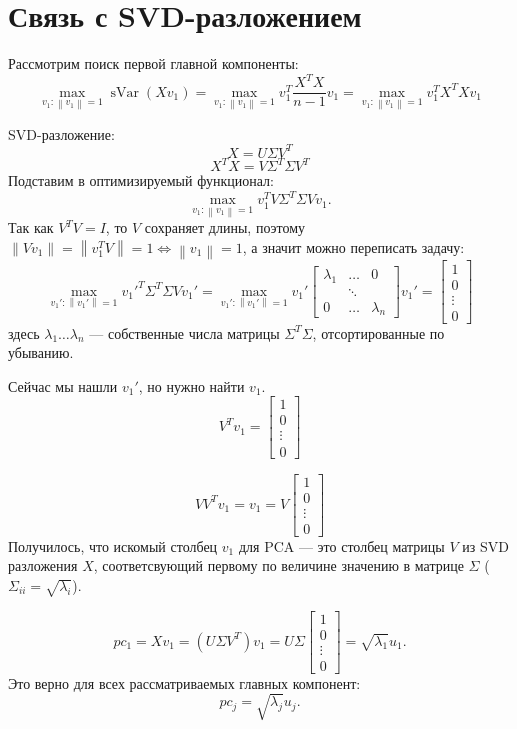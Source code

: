 \documentclass[12pt]{article} %
\theoremstyle{definition} %
\DeclareMathOperator{\sVar}{sVar}
\begin{document}
\section{Связь с SVD-разложением}
Рассмотрим поиск первой главной компоненты:
\[ \max_{v_1: \left\| v_1 \right\| = 1} \sVar(Xv_1)
= \max_{v_1: \left\| v_1 \right\| = 1} v_1^T \frac{X^TX}{n-1} v_1 =
\max_{v_1: \left\| v_1 \right\| = 1} v_1^T X^TX v_1 \]

SVD-разложение:
\[ X = U\Sigma V^T \]
\[ X^TX = V \Sigma^T \Sigma V^T \]
Подставим в оптимизируемый функционал:
\[ \max_{v_1: \left\| v_1 \right\| = 1} v_1^T V \Sigma^T \Sigma V v_1.\]
Так как \(V^TV=I\), то \(V\) сохраняет длины, поэтому
\( \left\| Vv_1 \right\| = \left\| v_1^T V \right\| = 1 \iff \left\| v_1 \right\|=1\), а значит можно переписать задачу:
\[ \max_{v_1': \left\| v_1' \right\| = 1} v_1'^T \Sigma^T \Sigma V v_1'
=
\max_{v_1': \left\| v_1' \right\| = 1}
v_1'
\begin{bmatrix}
\lambda_1 & \dots & 0\\
& \ddots &\\
0 & \dots & \lambda_n
\end{bmatrix} v_1' =
\begin{bmatrix}
1\\
0\\
\vdots\\
0
\end{bmatrix}\]
здесь \(\lambda_1 \dots \lambda_n\)  —  собственные числа матрицы \(\Sigma^T\Sigma\),
отсортированные по убыванию.

Сейчас мы нашли \(v_1'\), но нужно найти \(v_1\).
\[V^Tv_1 =
\begin{bmatrix}
1\\
0\\
\vdots\\
0
\end{bmatrix}\]

\[VV^Tv_1 = v_1 = V
\begin{bmatrix}
1\\
0\\
\vdots\\
0
\end{bmatrix}\]
Получилось, что искомый столбец \(v_1\) для PCA  —  это столбец матрицы \(V\) из SVD разложения \(X\), соответсвующий первому по величине значению в матрице \( \Sigma\) (\(\Sigma_{ii} = \sqrt{\lambda_i}\)).

\[
pc_1 = Xv_1 = (U\Sigma V^T)v_1 =
U \Sigma
\begin{bmatrix}
1\\
0\\
\vdots\\
0
\end{bmatrix}=
\sqrt{\lambda_1}u_1.
\]
Это верно для всех рассматриваемых главных компонент:
\[pc_j = \sqrt{\lambda_j} u_j.\]
\end{document}
